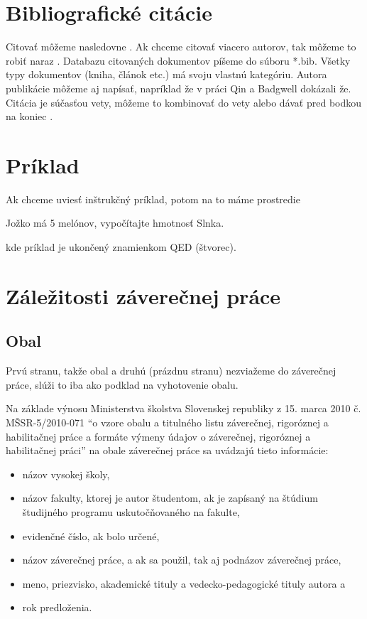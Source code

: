 \section{Bibliografické citácie}

Citovať môžeme nasledovne \cite{Eykhoff84}. Ak chceme citovať viacero autorov, tak môžeme to robiť naraz \cite{Fontes00,Eykhoff84}. Databazu citovaných dokumentov píšeme do súboru *.bib. Všetky typy dokumentov (kniha, článok etc.) má svoju vlastnú kategóriu. Autora publikácie môžeme aj napísať, napríklad že v práci Qin a Badgwell \cite{Qin99} dokázali že. Citácia je súčasťou vety, môžeme to kombinovať do vety \cite{Karny80} alebo dávať pred bodkou na koniec \cite{Far90}.

\section{Príklad}

Ak chceme uviesť inštrukčný príklad, potom na to máme prostredie
\begin{exmp}
Jožko má 5 melónov, vypočítajte hmotnosť Slnka.
\end{exmp}
kde príklad je ukončený znamienkom QED (štvorec).


\section{Záležitosti záverečnej práce}

\subsection{Obal}

Prvú stranu, takže obal a druhú (prázdnu stranu) nezviažeme do záverečnej práce, slúži to iba ako podklad na vyhotovenie obalu.

Na základe výnosu Ministerstva školstva Slovenskej republiky z 15. marca 2010 č. MŠSR-5/2010-071 ``o vzore obalu a titulného listu záverečnej, rigoróznej a habilitačnej práce a formáte výmeny údajov o záverečnej, rigoróznej a habilitačnej práci''  na obale záverečnej práce sa uvádzajú tieto informácie:
\begin{itemize}
\item  názov vysokej školy,
\item názov fakulty, ktorej je autor študentom, ak je zapísaný na štúdium študijného programu
uskutočňovaného na fakulte,
\item evidenčné číslo, ak bolo určené,
\item názov záverečnej práce, a ak sa použil, tak aj podnázov záverečnej práce,
\item meno, priezvisko, akademické tituly a vedecko-pedagogické tituly autora a
\item rok predloženia.
\end{itemize}


